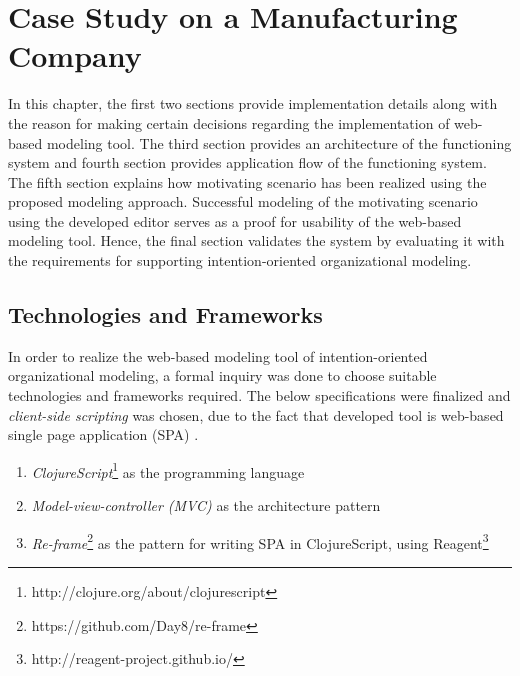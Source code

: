 \chapter{Case Study on a Manufacturing Company}
\label{chap:casestudy}

In this chapter, the first two sections provide implementation details along with the reason for making certain decisions regarding the implementation of web-based modeling tool. The third section provides an architecture of the functioning system and fourth section provides application flow of the functioning system. The fifth section explains how motivating scenario has been realized using the proposed modeling approach. Successful modeling of the motivating scenario using the developed editor serves as a proof for usability of the web-based modeling tool. Hence, the final section validates the system by evaluating it with the requirements for supporting intention-oriented organizational modeling. 

\section{Technologies and Frameworks}
\label{subsec:specifications}
In order to realize the web-based modeling tool of intention-oriented organizational modeling, a formal inquiry was done to choose suitable technologies and frameworks required. The below specifications were finalized and \textit{client-side scripting} \cite{Sierra2012} was chosen, due to the fact that developed tool is web-based single page application (SPA) \cite{Mikowski2013}. 

\begin{enumerate}   
	\item \textit{ClojureScript}\footnote{http://clojure.org/about/clojurescript} as the programming language
	\item \textit{Model-view-controller (MVC)} \cite{Deacon2009}  as the architecture pattern
	\item \textit{Re-frame}\footnote{https://github.com/Day8/re-frame} as the pattern for writing SPA in ClojureScript, using Reagent\footnote{http://reagent-project.github.io/}	
\end{enumerate}

